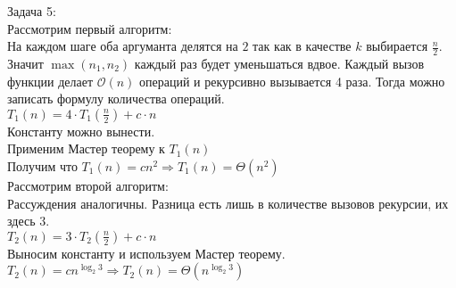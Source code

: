 \documentclass[a4paper, 11pt]{article}
\begin{document}
\quad\quad Задача 5:\\
Рассмотрим первый алгоритм:\\
На каждом шаге оба аргуманта делятся на $2$ так как в качестве $k$ выбирается $\frac{n}{2}$. Значит $\max(n_1, n_2)$ каждый раз будет уменьшаться вдвое. Каждый вызов функции делает $\mathcal{O}(n)$ операций и рекурсивно вызывается 4 раза. Тогда можно записать формулу количества операций.\\
$T_1(n) = 4 \cdot T_1(\frac{n}{2}) + c \cdot n$\\
Константу можно вынести.\\
Применим Мастер теорему к $T_1(n)$\\Получим что $T_1(n) = cn^2 \Rightarrow T_1(n) = \Theta(n^2)$\\
Рассмотрим второй алгоритм:\\
Рассуждения аналогичны. Разница есть лишь в количестве вызовов рекурсии, их здесь $3$.\\
$T_2(n) = 3 \cdot T_2(\frac{n}{2}) + c \cdot n$\\
Выносим константу и используем Мастер теорему.\\
$T_2(n) = cn^{\log_{2}{3}} \Rightarrow T_2(n) = \Theta(n^{\log_{2}{3}})$
\end{document}
